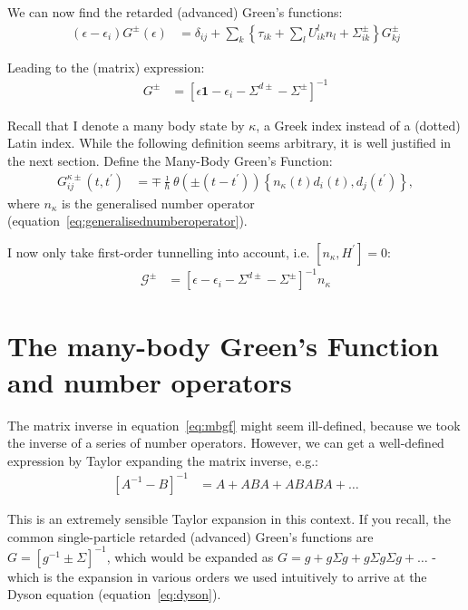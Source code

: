 We can now find the retarded (advanced) Green's functions:
\begin{align*}
\left(\epsilon-\epsilon_i\right) G^\pm (\epsilon) &= \delta_{ij} + \sum_k \left\{ \tau_{ik} + \sum_l U^l_{ik} n_l + \Sigma^\pm_{ik}\right\} G^\pm_{kj}
\end{align*}

Leading to the (matrix) expression:
\begin{align*}
G^\pm &= \left[ \epsilon \mathbf{1} - \epsilon_i - \Sigma^{d\pm} - \Sigma^\pm \right]^{-1}
\end{align*}

Recall that I denote a many body state by $\kappa$, a Greek index instead of a (dotted) Latin index. While the following definition seems arbitrary, it is well justified in the next section. Define the Many-Body Green's Function:
\begin{align*}
G^{\kappa\pm}_{ij}(t, t^\prime) &= \mp \frac{\imath}{\hbar} \theta( \pm(t-t^\prime)) \left\{ n_\kappa(t) d_i (t), d_j(t^\prime)\right\},
\end{align*}
where $n_\kappa$ is the generalised number operator (equation~\ref{eq:generalisednumberoperator}).

I now only take first-order tunnelling into account, i.e. $\left[ n_\kappa, H^\prime \right] = 0$:
\begin{align}
\mathscr{G}^\pm &= \left[ \epsilon - \epsilon_i - \Sigma^{d\pm} - \Sigma^\pm \right]^{-1} n_\kappa \label{eq:mbgf}
\end{align}
 
\section{The many-body Green's Function and number operators}
\label{sec:mbgfno}
The matrix inverse in equation~\ref{eq:mbgf} might seem ill-defined, because we took the inverse of a series of number operators. However, we can get a well-defined expression by Taylor expanding the matrix inverse, e.g.:
\begin{align}
\left[ A^{-1} - B\right]^{-1} &= A + ABA + ABABA + \ldots
\label{eq:inversionexpansion}
\end{align}

This is an extremely sensible Taylor expansion in this context. If you recall, the common single-particle retarded (advanced) Green's functions are $G = \left[ g^{-1} \pm \Sigma \right]^{-1}$, which would be expanded as $G = g + g\Sigma g + g\Sigma g\Sigma g + \ldots$ - which is the expansion in various orders we used intuitively to arrive at the Dyson equation (equation~\ref{eq:dyson}).


